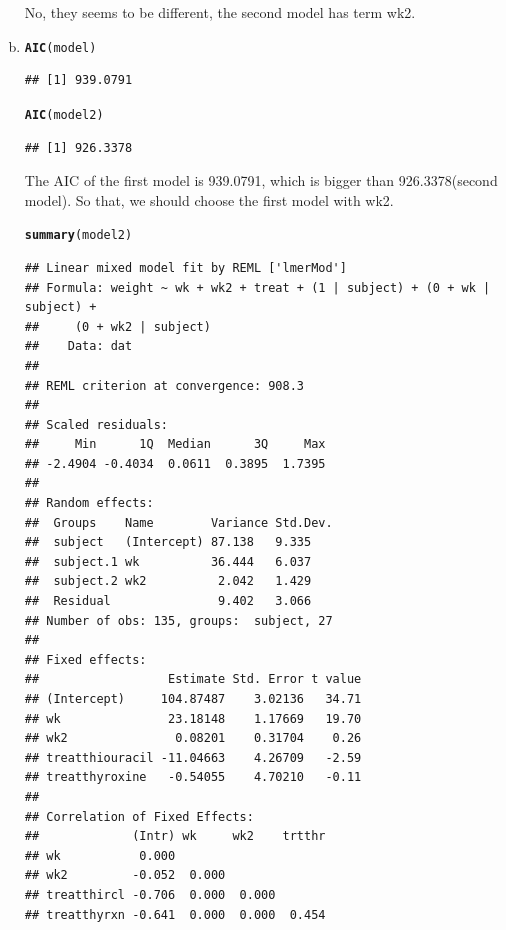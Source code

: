 \documentclass{article}\usepackage[]{graphicx}\usepackage[]{color}
\makeatletter
\newcommand{\hlstd}[1]{\textcolor[rgb]{0.345,0.345,0.345}{#1}}%
\newcommand{\hlkwd}[1]{\textcolor[rgb]{0.737,0.353,0.396}{\textbf{#1}}}%
\newenvironment{kframe}{%
 \def\at@end@of@kframe{}%
 \ifinner\ifhmode%
  \def\at@end@of@kframe{\end{minipage}}%
  \begin{minipage}{\columnwidth}%
 \fi\fi%
 \def\FrameCommand##1{\hskip\@totalleftmargin \hskip-\fboxsep
 \colorbox{shadecolor}{##1}\hskip-\fboxsep
     \hskip-\linewidth \hskip-\@totalleftmargin \hskip\columnwidth}%
 \MakeFramed {\advance\hsize-\width
   \@totalleftmargin\z@ \linewidth\hsize
   \@setminipage}}%
 {\par\unskip\endMakeFramed%
 \at@end@of@kframe}
\newenvironment{knitrout}{}{} %
\makeatother
\begin{document}
\begin{enumerate}[(a)]
\qquad No, they seems to be different, the second model has term wk2.

\item

\begin{knitrout}
\color{fgcolor}\begin{kframe}
\begin{alltt}
  \hlkwd{AIC}\hlstd{(model)}
\end{alltt}
\begin{verbatim}
## [1] 939.0791
\end{verbatim}
\begin{alltt}
  \hlkwd{AIC}\hlstd{(model2)}
\end{alltt}
\begin{verbatim}
## [1] 926.3378
\end{verbatim}
\end{kframe}
\end{knitrout}

\qquad The AIC of the first model is 939.0791, which is bigger than 926.3378(second model). So that, we should choose the first model with wk2.

\begin{knitrout}
\color{fgcolor}\begin{kframe}
\begin{alltt}
  \hlkwd{summary}\hlstd{(model2)}
\end{alltt}
\begin{verbatim}
## Linear mixed model fit by REML ['lmerMod']
## Formula: weight ~ wk + wk2 + treat + (1 | subject) + (0 + wk | subject) +  
##     (0 + wk2 | subject)
##    Data: dat
## 
## REML criterion at convergence: 908.3
## 
## Scaled residuals: 
##     Min      1Q  Median      3Q     Max 
## -2.4904 -0.4034  0.0611  0.3895  1.7395 
## 
## Random effects:
##  Groups    Name        Variance Std.Dev.
##  subject   (Intercept) 87.138   9.335   
##  subject.1 wk          36.444   6.037   
##  subject.2 wk2          2.042   1.429   
##  Residual               9.402   3.066   
## Number of obs: 135, groups:  subject, 27
## 
## Fixed effects:
##                  Estimate Std. Error t value
## (Intercept)     104.87487    3.02136   34.71
## wk               23.18148    1.17669   19.70
## wk2               0.08201    0.31704    0.26
## treatthiouracil -11.04663    4.26709   -2.59
## treatthyroxine   -0.54055    4.70210   -0.11
## 
## Correlation of Fixed Effects:
##             (Intr) wk     wk2    trtthr
## wk           0.000                     
## wk2         -0.052  0.000              
## treatthircl -0.706  0.000  0.000       
## treatthyrxn -0.641  0.000  0.000  0.454
\end{verbatim}
\end{kframe}
\end{knitrout}


\end{enumerate}
\end{document}
